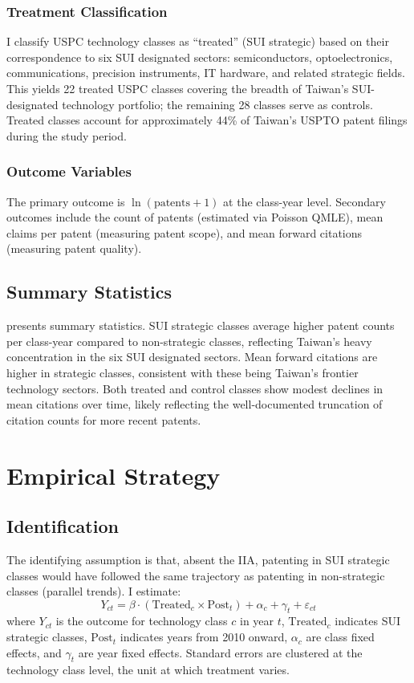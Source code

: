 \documentclass[12pt]{article}
\begin{document}
\subsubsection*{Treatment Classification} I classify USPC technology classes as ``treated'' (SUI strategic) based on their correspondence to six SUI designated sectors: semiconductors, optoelectronics, communications, precision instruments, IT hardware, and related strategic fields. This yields 22 treated USPC classes covering the breadth of Taiwan's SUI-designated technology portfolio; the remaining 28 classes serve as controls. Treated classes account for approximately 44\% of Taiwan's USPTO patent filings during the study period.

\subsubsection*{Outcome Variables} The primary outcome is $\ln(\text{patents} + 1)$ at the class-year level. Secondary outcomes include the count of patents (estimated via Poisson QMLE), mean claims per patent (measuring patent scope), and mean forward citations (measuring patent quality).

\subsection{Summary Statistics}



 presents summary statistics. SUI strategic classes average higher patent counts per class-year compared to non-strategic classes, reflecting Taiwan's heavy concentration in the six SUI designated sectors. Mean forward citations are higher in strategic classes, consistent with these being Taiwan's frontier technology sectors. Both treated and control classes show modest declines in mean citations over time, likely reflecting the well-documented truncation of citation counts for more recent patents.


\section{Empirical Strategy}

\subsection{Identification}

The identifying assumption is that, absent the IIA, patenting in SUI strategic classes would have followed the same trajectory as patenting in non-strategic classes (parallel trends). I estimate:
\begin{equation}
Y_{ct} = \beta \cdot (\text{Treated}_c \times \text{Post}_t) + \alpha_c + \gamma_t + \varepsilon_{ct}
\label{eq:did}
\end{equation}
where $Y_{ct}$ is the outcome for technology class $c$ in year $t$, $\text{Treated}_c$ indicates SUI strategic classes, $\text{Post}_t$ indicates years from 2010 onward, $\alpha_c$ are class fixed effects, and $\gamma_t$ are year fixed effects. Standard errors are clustered at the technology class level, the unit at which treatment varies.
\end{document}
